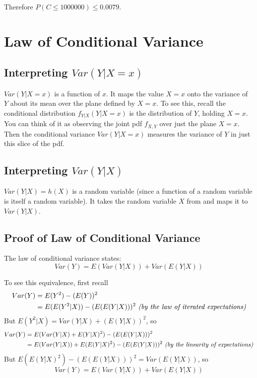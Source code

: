 \documentclass[paper=a4, fontsize=11pt]{scrartcl} %
\numberwithin{equation}{section} %
\numberwithin{figure}{section} %
\numberwithin{table}{section} %
\begin{document}
Therefore $P(C \leq 1000000) \leq 0.0079$.


\section{Law of Conditional Variance}

\subsection{Interpreting $Var(Y | X=x)$}

$Var(Y | X=x)$ is a function of $x$. It maps the value $X = x$ onto the variance of $Y$ about its mean over the plane defined by $X=x$. To see this, recall the conditional distribution $f_{Y|X}(Y | X=x)$ is the distribution of $Y$, holding $X = x$. You can think of it as observing the joint pdf $f_{X,Y}$ over just the plane $X=x$. Then the conditional variance $Var(Y | X=x)$ measures the variance of $Y$ in just this slice of the pdf.

\subsection{Interpreting $Var(Y | X)$}

$Var(Y | X) = h(X)$ is a random variable (since a function of a random variable is itself a random variable). It takes the random variable $X$ from and maps it to $Var(Y | X)$.

\subsection{Proof of Law of Conditional Variance}

The law of conditional variance states:
\begin{equation*}
Var(Y) = E(Var(Y|X)) + Var(E(Y|X))
\end{equation*}

To see this equivalence, first recall
\begin{align*}
Var(Y) &= E(Y^2) - (E(Y))^2\\
   &= E(E(Y^2|X)) - (E(E(Y|X)))^2 \textrm{   \textit{(by the law of iterated expectations)}}
\end{align*}
But $E(Y^2|X) = Var(Y|X) + (E(Y|X))^2$, so
\begin{align*}
Var(Y) &= E(Var(Y|X)+E(Y|X)^2) - (E(E(Y|X)))^2\\
   &=  E(Var(Y|X))+E(E(Y|X)^2) - (E(E(Y|X)))^2\textrm{   \textit{(by the linearity of expectations)}}
\end{align*}
But $E(E(Y|X)^2) - (E(E(Y|X)))^2 = Var(E(Y|X))$, so
\begin{equation*}
Var(Y) = E(Var(Y|X)) + Var(E(Y|X))
\end{equation*}
\end{document}
